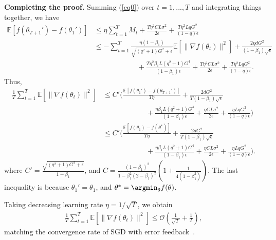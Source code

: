\documentclass[11pt]{article}
\begin{document}
\textbf{Completing the proof.} Summing (\ref{eq0}) over $t=1,...,T$ and integrating things together, we have
\begin{align*}
    \mathbb E[f(\theta_{T+1}')-f(\theta_1')]&\leq \eta \sum_{t=1}^T M_t+\frac{T\eta^2CL\sigma^2}{2\epsilon}+\frac{T\eta^2 LqG^2}{(1-q)\epsilon}\\
    &\leq -\sum_{t=1}^T \frac{\eta(1-\beta_1)}{\sqrt{(q^2+1)G^2+\epsilon}}\mathbb E[\|\nabla f(\theta_t)\|^2]+\frac{2\eta dG^2}{(1-\beta_1)\sqrt\epsilon}\\
    &\hspace{1in}+ \frac{T \eta^2\beta_1 L(q^2+1)G^4}{(1-\beta_1)\epsilon} +\frac{T\eta^2CL\sigma^2}{2\epsilon}+\frac{T\eta^2 LqG^2}{(1-q)\epsilon}.
\end{align*}
Thus,
\begin{align*}
    \frac{1}{T}\sum_{t=1}^T \mathbb E[\|\nabla f(\theta_t)\|^2]&\leq C'\Big(\frac{\mathbb E[f(\theta_1')-f(\theta_{T+1}')]}{T\eta}+\frac{2dG^2}{T(1-\beta_1)\sqrt\epsilon}\\
    &\hspace{1in} + \frac{\eta\beta_1 L(q^2+1)G^4}{(1-\beta_1)\epsilon} +\frac{\eta CL\sigma^2}{2\epsilon}+\frac{\eta LqG^2}{(1-q)\epsilon} \Big)\\
    &\leq C'\Big(\frac{\mathbb E[f(\theta_1)-f(\theta^*)]}{T\eta}+\frac{2dG^2}{T(1-\beta_1)\sqrt\epsilon}\\
    &\hspace{1in} + \frac{\eta\beta_1 L(q^2+1)G^4}{(1-\beta_1)\epsilon} +\frac{\eta CL\sigma^2}{2\epsilon}+\frac{\eta LqG^2}{(1-q)\epsilon} \Big).
\end{align*}
where $C'=\frac{\sqrt{(q^2+1)G^2+\epsilon}}{1-\beta_1}$, and $C=\frac{(1-\beta_1)^2}{1-\beta_1^2(2-\beta_1)^2}(1+\frac{1}{4(1-\beta_1^2)})$. The last inequality is because $\theta_1'=\theta_1$, and $\theta^*=\argmin_\theta f(\theta)$.

Taking decreasing learning rate $\eta=1/\sqrt T$, we obtain
\begin{align*}
    \frac{1}{T}\sum_{t=1}^T \mathbb E[\|\nabla f(\theta_t)\|^2]\leq \mathcal O(\frac{1}{\sqrt T}+\frac{1}{T}),
\end{align*}
matching the convergence rate of SGD with error feedback~\cite{karimireddy2019error}.
\end{document}
